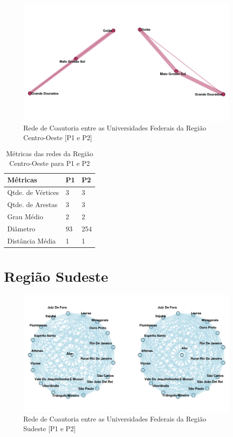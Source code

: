 \documentclass[12pt]{article}
\begin{document}
\begin{figure}[H]
\centering
\includegraphics[scale=0.6]{images/centro_oeste.png}
\caption{Rede de Coautoria entre as Universidades Federais da Região Centro-Oeste [P1 e P2]}
\label{rede-centro}
\end{figure}


\begin{table}[H]
\centering
\begin{tabular}{lll}
\hline
\rowcolor[HTML]{C0C0C0} 
\textbf{Métricas} & \textbf{P1} & \textbf{P2} \\ \hline
Qtde. de Vértices & 3           & 3           \\ \hline
Qtde. de Arestas  & 3           & 3          \\ \hline
Grau Médio        & 2           & 2          \\ \hline
Diâmetro          & 93          & 254         \\ \hline
Distância Média   & 1           & 1            \\ \hline
\end{tabular}
\caption{Métricas das redes da Região Centro-Oeste para P1 e P2}
\end{table}

\section{Região Sudeste}

\begin{figure}[H]
\centering
\includegraphics[scale=0.6]{images/sudeste.png}
\caption{Rede de Coautoria entre as Universidades Federais da Região Sudeste [P1 e P2]}
\label{rede-sudeste}
\end{figure}
\end{document}
